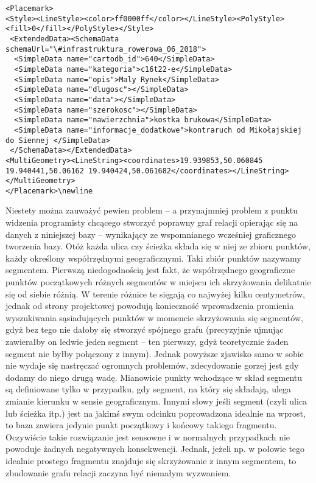 \lstset{language=XML}
\begin{lstlisting}
<Placemark>
<Style><LineStyle><color>ff0000ff</color></LineStyle><PolyStyle><fill>0</fill></PolyStyle></Style>
 <ExtendedData><SchemaData schemaUrl="\#infrastruktura_rowerowa_06_2018">
  <SimpleData name="cartodb_id">640</SimpleData>
  <SimpleData name="kategoria">c16t22-e</SimpleData>
  <SimpleData name="opis">Maly Rynek</SimpleData>
  <SimpleData name="dlugosc"></SimpleData>
  <SimpleData name="data"></SimpleData>
  <SimpleData name="szerokosc"></SimpleData>
  <SimpleData name="nawierzchnia">kostka brukowa</SimpleData>
  <SimpleData name="informacje_dodatkowe">kontraruch od Mikołajskiej do Siennej </SimpleData>
 </SchemaData></ExtendedData>
<MultiGeometry><LineString><coordinates>19.939853,50.060845 19.940441,50.06162 19.940424,50.061682</coordinates></LineString></MultiGeometry>
</Placemark>\newline
\end{lstlisting}

Niestety można zauważyć pewien problem – a przynajmniej problem z punktu widzenia programisty chcącego stworzyć poprawny graf relacji opierając się na danych z niniejszej bazy – wynikający ze wspomnianego wcześniej graficznego tworzenia bazy. Otóż każda ulica czy ścieżka składa się w niej ze zbioru punktów, każdy określony współrzędnymi geograficznymi. Taki zbiór punktów nazywamy segmentem. Pierwszą niedogodnością jest fakt, że współrzędnego geograficzne punktów początkowych różnych segmentów w miejscu ich skrzyżowania delikatnie się od siebie różnią. W terenie różnice te sięgają co najwyżej kilku centymetrów, jednak od strony projektowej powodują konieczność wprowadzenia promienia wyszukiwania sąsiadujących punktów w momencie skrzyżowania się segmentów, gdyż bez tego nie dałoby się stworzyć spójnego grafu (precyzyjnie ujmując zawierałby on ledwie jeden segment – ten pierwszy, gdyż teoretycznie żaden segment nie byłby połączony z innym). Jednak powyższe zjawisko samo w sobie nie wydaje się nastręczać ogromnych problemów, zdecydowanie gorzej jest gdy dodamy do niego drugą wadę. Mianowicie punkty wchodzące w skład segmentu są definiowane tylko w przypadku, gdy segment, na który się składają, ulega zmianie kierunku w sensie geograficznym. Innymi słowy jeśli segment (czyli ulica lub ścieżka itp.) jest na jakimś swym odcinku poprowadzona idealnie na wprost, to baza zawiera jedynie punkt początkowy i końcowy takiego fragmentu. Oczywiście takie rozwiązanie jest sensowne i w normalnych przypadkach nie powoduje żadnych negatywnych konsekwencji. Jednak, jeżeli np. w połowie tego idealnie prostego fragmentu znajduje się skrzyżowanie z innym segmentem, to zbudowanie grafu relacji zaczyna być niemałym wyzwaniem. 

